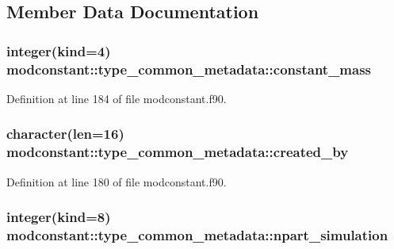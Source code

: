\subsection{Member Data Documentation}
\hypertarget{structmodconstant_1_1type__common__metadata_acfe577e21098bca8ccba3ce6f3072790}{
\subsubsection[{constant\-\_\-mass}]{\setlength{\rightskip}{0pt plus 5cm}integer(kind=4) modconstant\-::type\-\_\-common\-\_\-metadata\-::constant\-\_\-mass}}\label{structmodconstant_1_1type__common__metadata_acfe577e21098bca8ccba3ce6f3072790}


Definition at line 184 of file modconstant.\-f90.

\hypertarget{structmodconstant_1_1type__common__metadata_af9a961d4c57cd62a7733a153caa0b322}{
\subsubsection[{created\-\_\-by}]{\setlength{\rightskip}{0pt plus 5cm}character(len=16) modconstant\-::type\-\_\-common\-\_\-metadata\-::created\-\_\-by}}\label{structmodconstant_1_1type__common__metadata_af9a961d4c57cd62a7733a153caa0b322}


Definition at line 180 of file modconstant.\-f90.

\hypertarget{structmodconstant_1_1type__common__metadata_aa54480d2f806e2a54479a34b80246888}{
\subsubsection[{npart\-\_\-simulation}]{\setlength{\rightskip}{0pt plus 5cm}integer(kind=8) modconstant\-::type\-\_\-common\-\_\-metadata\-::npart\-\_\-simulation}}\label{structmodconstant_1_1type__common__metadata_aa54480d2f806e2a54479a34b80246888}


